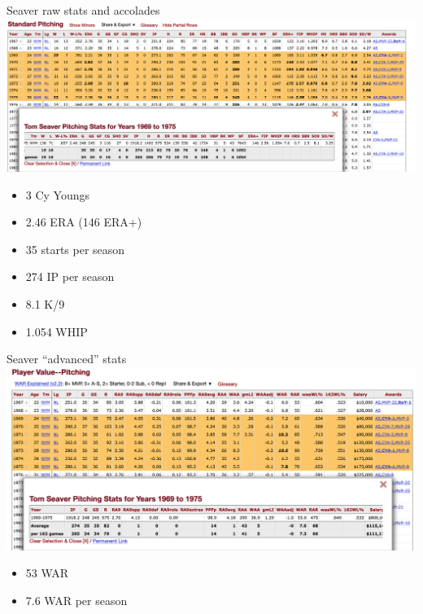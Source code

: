 \documentclass[
  ignorenonframetext,
]{beamer}
\providecommand{\tightlist}{%
  \setlength{\itemsep}{0pt}\setlength{\parskip}{0pt}}
\begin{document}
\begin{frame}{Seaver raw stats and accolades}
\protect\hypertarget{seaver-raw-stats-and-accolades}{}
\includegraphics{Seaver_raw.png}

\begin{itemize}
\tightlist
\item
  3 Cy Youngs
\item
  2.46 ERA (146 ERA+)
\item
  35 starts per season
\item
  274 IP per season
\item
  8.1 K/9
\item
  1.054 WHIP
\end{itemize}
\end{frame}

\begin{frame}{Seaver ``advanced'' stats}
\protect\hypertarget{seaver-advanced-stats}{}
\includegraphics{Seaver_advanced.png}

\begin{itemize}
\tightlist
\item
  53 WAR
\item
  7.6 WAR per season
\end{itemize}
\end{frame}
\end{document}
